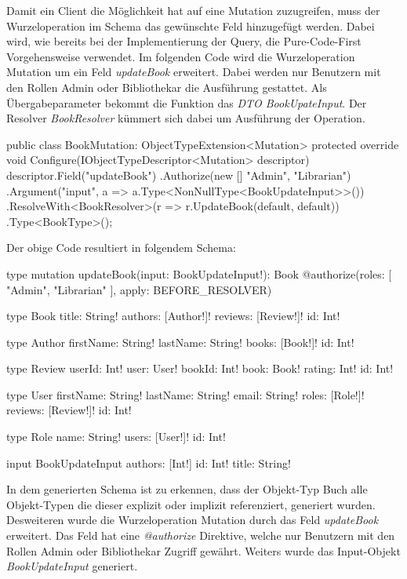 Damit ein Client die Möglichkeit hat auf eine Mutation zuzugreifen, muss der Wurzeloperation im Schema das gewünschte Feld hinzugefügt werden.
Dabei wird, wie bereits bei der Implementierung der Query, die Pure-Code-First Vorgehensweise verwendet.
\newline
Im folgenden Code wird die Wurzeloperation Mutation um ein Feld \textit{updateBook} erweitert.
Dabei werden nur Benutzern mit den Rollen Admin oder Bibliothekar die Ausführung gestattet.
Als Übergabeparameter bekommt die Funktion das \textit{DTO BookUpateInput}.
Der Resolver \textit{BookResolver} kümmert sich dabei um Ausführung der Operation.

\begin{JsCode}
public class BookMutation: ObjectTypeExtension<Mutation>{
    protected override void Configure(IObjectTypeDescriptor<Mutation> descriptor) {
        descriptor.Field("updateBook")
            .Authorize(new [] {"Admin", "Librarian"})
            .Argument("input", a => a.Type<NonNullType<BookUpdateInput>>())
            .ResolveWith<BookResolver>(r => r.UpdateBook(default, default))
            .Type<BookType>();
    }
}
\end{JsCode}

Der obige Code resultiert in folgendem Schema:
\begin{JsCode}
type mutation{
    updateBook(input: BookUpdateInput!): Book @authorize(roles: [ "Admin", "Librarian" ], apply: BEFORE_RESOLVER)
}

type Book {
  title: String!
  authors: [Author!]!
  reviews: [Review!]!
  id: Int!
}

type Author {
  firstName: String!
  lastName: String!
  books: [Book!]!
  id: Int!
}

type Review {
  userId: Int!
  user: User!
  bookId: Int!
  book: Book!
  rating: Int!
  id: Int!
}

type User {
  firstName: String!
  lastName: String!
  email: String!
  roles: [Role!]!
  reviews: [Review!]!
  id: Int!
}

type Role {
  name: String!
  users: [User!]!
  id: Int!
}

input BookUpdateInput {
  authors: [Int!]
  id: Int!
  title: String!
}
\end{JsCode}

In dem generierten Schema ist zu erkennen, dass der Objekt-Typ Buch alle Objekt-Typen die dieser explizit oder implizit referenziert, generiert wurden.
Desweiteren wurde die Wurzeloperation Mutation durch das Feld \textit{updateBook} erweitert.
Das Feld hat eine \textit{@authorize} Direktive, welche nur Benutzern mit den Rollen Admin oder Bibliothekar Zugriff gewährt.
Weiters wurde das Input-Objekt \textit{BookUpdateInput} generiert.
\newline

